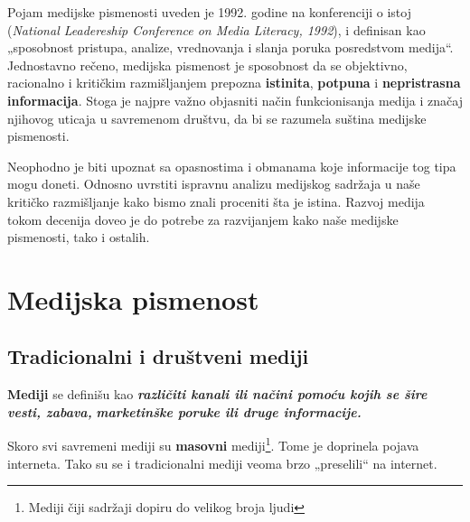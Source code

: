 \documentclass[a4paper]{article}
\begin{document}
Pojam medijske pismenosti uveden je 1992. godine na konferenciji o istoj (\emph{National Leadereship Conference on Media Literacy, 1992}), i definisan kao „sposobnost pristupa, analize, vrednovanja i slanja poruka posredstvom medija“. Jednostavno rečeno, medijska pismenost je sposobnost da se objektivno, racionalno i kritičkim razmišljanjem prepozna \textbf{istinita}, \textbf{potpuna} i \textbf{nepristrasna informacija}.  
Stoga je najpre važno objasniti način funkcionisanja medija i značaj njihovog uticaja u savremenom društvu, da bi se razumela suština medijske pismenosti.

Neophodno je biti upoznat sa opasnostima i obmanama koje informacije tog tipa mogu doneti. Odnosno uvrstiti ispravnu analizu medijskog sadržaja u naše kritičko razmišljanje kako bismo znali proceniti šta je istina. Razvoj medija tokom decenija doveo je do potrebe za razvijanjem kako naše medijske pismenosti, tako i ostalih.

\newpage

\section{Medijska pismenost}

\subsection{Tradicionalni i društveni mediji}

	\textbf{{Mediji}} se definišu kao \emph{\textbf{{različiti kanali ili
			načini pomoću kojih se šire vesti, zabava,}}} \emph{\textbf{{marketinške
			poruke ili druge informacije.}}}

Skoro svi savremeni mediji su \textbf{masovni} mediji\footnote{Mediji čiji sadržaji dopiru do velikog broja ljudi}. Tome je doprinela
pojava interneta. Tako su se i tradicionalni mediji veoma brzo
„preselili`` na internet.
\end{document}
